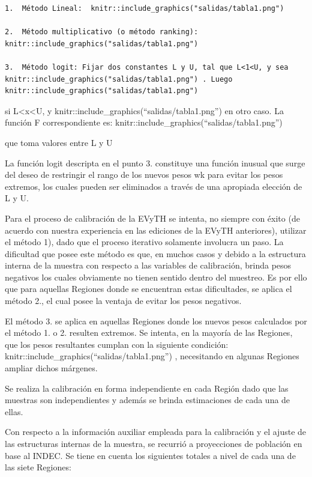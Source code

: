 \documentclass[
  openany]{book}
\begin{document}
\begin{verbatim}
1.  Método Lineal:  knitr::include_graphics("salidas/tabla1.png")

2.  Método multiplicativo (o método ranking):  knitr::include_graphics("salidas/tabla1.png")  

3.  Método logit: Fijar dos constantes L y U, tal que L<1<U, y sea knitr::include_graphics("salidas/tabla1.png") . Luego knitr::include_graphics("salidas/tabla1.png")
\end{verbatim}

si L\textless x\textless U, y knitr::include\_graphics(``salidas/tabla1.png'') en otro caso. La función F correspondiente es:
knitr::include\_graphics(``salidas/tabla1.png'')

que toma valores entre L y U

La función logit descripta en el punto 3. constituye una función inusual que surge del deseo de restringir el rango de los nuevos pesos wk para evitar los pesos extremos, los cuales pueden ser eliminados a través de una apropiada elección de L y U.

Para el proceso de calibración de la EVyTH se intenta, no siempre con éxito (de acuerdo con nuestra experiencia en las ediciones de la EVyTH anteriores), utilizar el método 1), dado que el proceso iterativo solamente involucra un paso. La dificultad que posee este método es que, en muchos casos y debido a la estructura interna de la muestra con respecto a las variables de calibración, brinda pesos negativos los cuales obviamente no tienen sentido dentro del muestreo. Es por ello que para aquellas Regiones donde se encuentran estas dificultades, se aplica el método 2., el cual posee la ventaja de evitar los pesos negativos.

El método 3. se aplica en aquellas Regiones donde los nuevos pesos calculados por el método 1. o 2. resulten extremos. Se intenta, en la mayoría de las Regiones, que los pesos resultantes cumplan con la siguiente condición: knitr::include\_graphics(``salidas/tabla1.png'') , necesitando en algunas Regiones ampliar dichos márgenes.

Se realiza la calibración en forma independiente en cada Región dado que las muestras son independientes y además se brinda estimaciones de cada una de ellas.

Con respecto a la información auxiliar empleada para la calibración y el ajuste de las estructuras internas de la muestra, se recurrió a proyecciones de población en base al INDEC. Se tiene en cuenta los siguientes totales a nivel de cada una de las siete Regiones:
\end{document}
